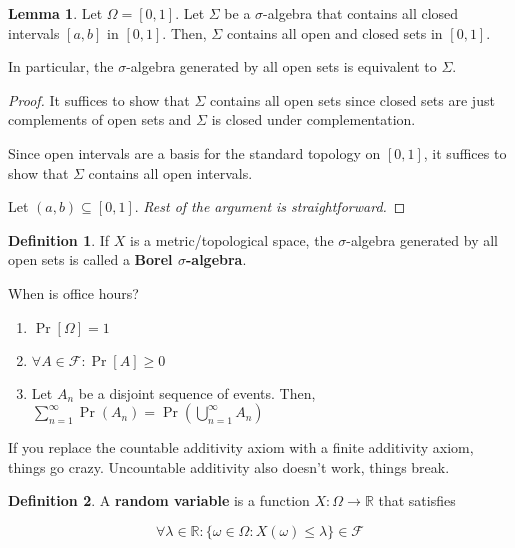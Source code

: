 \documentclass{article}
\theoremstyle{definition}
\newtheorem{definition}{Definition}
\newtheorem{lemma}[theorem]{Lemma}
\newcommand{\R}{\mathbb{R}}
\begin{document}
\begin{lemma}
    Let $\Omega = [0,1]$. Let $\Sigma$ be a $\sigma$-algebra that contains all closed intervals
    $[a,b]$ in $[0,1]$. Then, $\Sigma$ contains all open and closed sets in $[0,1]$.

    In particular, the $\sigma$-algebra generated by all open sets is equivalent to $\Sigma$.
\end{lemma}
\begin{proof}
    It suffices to show that $\Sigma$ contains all open sets since closed sets are just complements
    of open sets and $\Sigma$ is closed under complementation.

    Since open intervals are a basis for the standard topology on $[0,1]$, it suffices to show that
    $\Sigma$ contains all open intervals.

    Let $(a,b) \subseteq [0,1]$. \textit{Rest of the argument is straightforward.}
\end{proof}



\begin{definition}
    If $X$ is a metric/topological space, the $\sigma$-algebra generated by all open sets
    is called a \textbf{Borel $\sigma$-algebra}.
\end{definition}



\newpage

When is office hours?

\begin{enumerate}
    \item $\Pr[\Omega] = 1$
    \item $\forall A \in \mathcal{F}: \Pr[A] \geq 0$
    \item Let $A_{n}$ be a disjoint sequence of events. Then, $\sum_{n = 1}^{\infty} \Pr(A_{n}) = \Pr(\bigcup_{n = 1}^{\infty} A_{n})$
\end{enumerate}

If you replace the countable additivity axiom with a finite additivity axiom, 
things go crazy. Uncountable additivity also doesn't work, things break.

\begin{definition}
    A \textbf{random variable} is a function $X:\Omega \xrightarrow{} \R$ that
    satisfies

    \[\forall \lambda \in \R: \{\omega \in \Omega: X(\omega) \leq \lambda\} \in \mathcal{F}\]
\end{definition}
\end{document}
